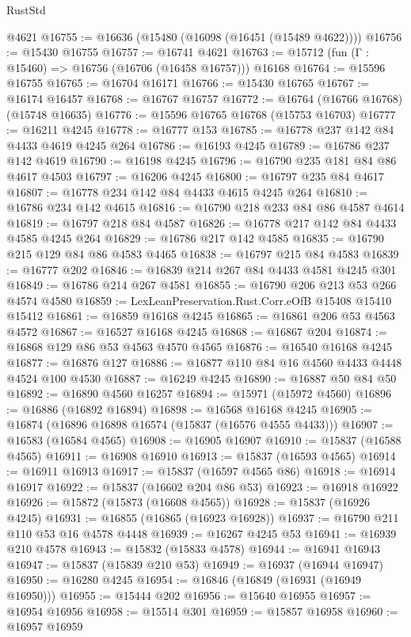 \begin{lexlean}{RustStd}
\begin{coremodule}
    @4621
@16755 := @16636 (@15480 (@16098 (@16451 (@15489 @4622))))
@16756 := @15430 @16755
@16757 := @16741 @4621
@16763 := @15712 (fun (Γ : @15460) => @16756 (@16706 (@16458 @16757))) @16168
@16764 := @15596 @16755
@16765 := @16704 @16171
@16766 := @15430 @16765
@16767 := @16174 @16457
@16768 := @16767 @16757
@16772 := @16764 (@16766 @16768) (@15748 @16635)
@16776 := @15596 @16765 @16768 (@15753 @16703)
@16777 := @16211 @4245
@16778 := @16777 @153
@16785 := @16778 @237 @142 @84 @4433 @4619 @4245 @264
@16786 := @16193 @4245
@16789 := @16786 @237 @142 @4619
@16790 := @16198 @4245
@16796 := @16790 @235 @181 @84 @86 @4617 @4503
@16797 := @16206 @4245
@16800 := @16797 @235 @84 @4617
@16807 := @16778 @234 @142 @84 @4433 @4615 @4245 @264
@16810 := @16786 @234 @142 @4615
@16816 := @16790 @218 @233 @84 @86 @4587 @4614
@16819 := @16797 @218 @84 @4587
@16826 := @16778 @217 @142 @84 @4433 @4585 @4245 @264
@16829 := @16786 @217 @142 @4585
@16835 := @16790 @215 @129 @84 @86 @4583 @4465
@16838 := @16797 @215 @84 @4583
@16839 := @16777 @202
@16846 := @16839 @214 @267 @84 @4433 @4581 @4245 @301
@16849 := @16786 @214 @267 @4581
@16855 := @16790 @206 @213 @53 @266 @4574 @4580
@16859 := LexLeanPreservation.Rust.Corr.eOfB @15408 @15410 @15412
@16861 := @16859 @16168 @4245
@16865 := @16861 @206 @53 @4563 @4572
@16867 := @16527 @16168 @4245
@16868 := @16867 @204
@16874 := @16868 @129 @86 @53 @4563 @4570 @4565
@16876 := @16540 @16168 @4245
@16877 := @16876 @127
@16886 := @16877 @110 @84 @16 @4560 @4433 @4448 @4524 @100 @4530
@16887 := @16249 @4245
@16890 := @16887 @50 @84 @50
@16892 := @16890 @4560 @16257
@16894 := @15971 (@15972 @4560)
@16896 := @16886 (@16892 @16894)
@16898 := @16568 @16168 @4245
@16905 := @16874 (@16896 @16898 @16574 (@15837 (@16576 @4555 @4433)))
@16907 := @16583 (@16584 @4565)
@16908 := @16905 @16907
@16910 := @15837 (@16588 @4565)
@16911 := @16908 @16910
@16913 := @15837 (@16593 @4565)
@16914 := @16911 @16913
@16917 := @15837 (@16597 @4565 @86)
@16918 := @16914 @16917
@16922 := @15837 (@16602 @204 @86 @53)
@16923 := @16918 @16922
@16926 := @15872 (@15873 (@16608 @4565))
@16928 := @15837 (@16926 @4245)
@16931 := @16855 (@16865 (@16923 @16928))
@16937 := @16790 @211 @110 @53 @16 @4578 @4448
@16939 := @16267 @4245 @53
@16941 := @16939 @210 @4578
@16943 := @15832 (@15833 @4578)
@16944 := @16941 @16943
@16947 := @15837 (@15839 @210 @53)
@16949 := @16937 (@16944 @16947)
@16950 := @16280 @4245
@16954 := @16846 (@16849 (@16931 (@16949 @16950)))
@16955 := @15444 @202
@16956 := @15640 @16955
@16957 := @16954 @16956
@16958 := @15514 @301
@16959 := @15857 @16958
@16960 := @16957 @16959

\end{coremodule}
\end{lexlean}
